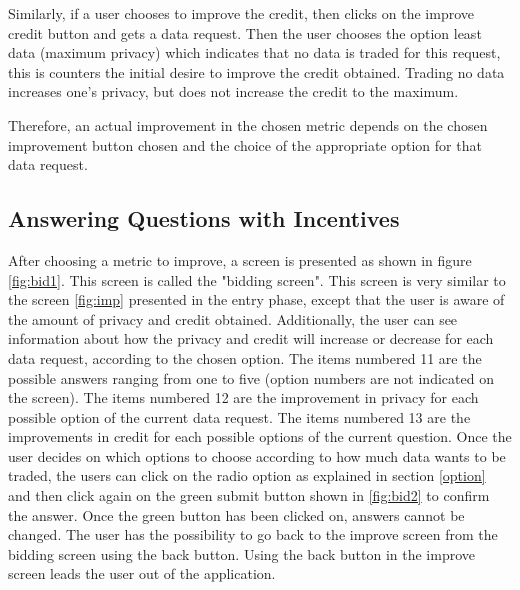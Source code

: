 Similarly, if a user chooses to improve the credit, then clicks on the improve credit button and gets a data request. Then the user chooses the option
least data (maximum privacy) which indicates that no data is traded for this request, this is counters the initial desire to improve the credit obtained. Trading no data increases one's privacy, but does not increase the credit to the maximum.

Therefore, an actual improvement in the chosen metric depends on the chosen improvement button chosen and the choice of the appropriate option for that data request.

\subsection{Answering Questions with Incentives}

After choosing a metric to improve, a screen is presented as shown in figure \ref{fig:bid1}.
This screen is called the "bidding screen". This screen is very similar to the screen \ref{fig:imp} presented in the entry phase, except that the user
is aware of the amount of privacy and credit obtained. Additionally, the user can see information about how the privacy and credit will increase or decrease for each data request, according to the chosen option. The items numbered 11 are the possible answers ranging from one to five (option numbers are not indicated on the screen).
The items numbered 12 are the improvement in privacy for each possible option of the current data request. The items numbered 13 are the improvements in credit for each possible options of the current question. Once the user decides on which options to choose according to how much data wants to be traded, the users can click on the radio option as explained in section \ref{option} and then click again on the green submit button shown in \ref{fig:bid2} to confirm the answer. Once the green button has been clicked on, answers cannot be changed. The user has the possibility to go back to the improve screen from the bidding screen using the back button. Using the back button in the improve screen leads the user out of the application.



